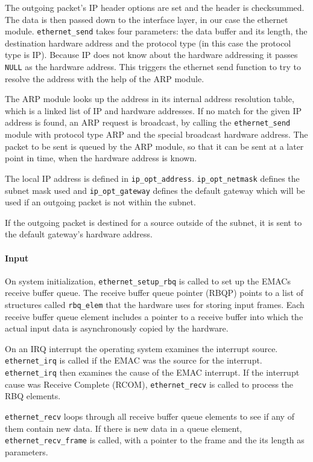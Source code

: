 \documentclass[11pt,twoside,abstract,notitlepage]{scrreprt}
\begin{document}
The outgoing packet's IP header options are set and the header is checksummed. The data is then passed down to the interface layer, in our case the ethernet module. \texttt{ethernet\_send} takes four parameters: the data buffer and its length, the destination hardware address and the protocol type (in this case the protocol type is IP). Because IP does not know about the hardware addressing it passes \texttt{NULL} as the hardware address. This triggers the ethernet send function to try to resolve the address with the help of the ARP module. 

The ARP module looks up the address in its internal address resolution table, which is a linked list of IP and hardware addresses. If no match for the given IP address is found, an ARP request is broadcast, by calling the \texttt{ethernet\_send} module with protocol type ARP and the special broadcast hardware address. The packet to be sent is queued by the ARP module, so that it can be sent at a later point in time, when the hardware address is known. 

The local IP address is defined in \texttt{ip\_opt\_address}. \texttt{ip\_opt\_netmask} defines the subnet mask used and \texttt{ip\_opt\_gateway} defines the default gateway which will be used if an outgoing packet is not within the subnet.

If the outgoing packet is destined for a source outside of the subnet, it is sent to the default gateway's hardware address. 

\paragraph{Input}
On system initialization, \texttt{ethernet\_setup\_rbq} is called to set up the EMACs receive buffer queue. The receive buffer queue pointer (RBQP) points to a list of structures called \texttt{rbq\_elem} that the hardware uses for storing input frames. Each receive buffer queue element includes a pointer to a receive buffer into which the actual input data is asynchronously copied by the hardware. 

On an IRQ interrupt the operating system examines the interrupt source. \texttt{ethernet\_irq} is called if the EMAC was the source for the interrupt. \texttt{ethernet\_irq} then examines the cause of the EMAC interrupt. If the interrupt cause was Receive Complete (RCOM), \texttt{ethernet\_recv} is called to process the RBQ elements. 

\texttt{ethernet\_recv} loops through all receive buffer queue elements to see if any of them contain new data. If there is new data in a queue element, \texttt{ethernet\_recv\_frame} is called, with a pointer to the frame and the its length as parameters.
\end{document}
